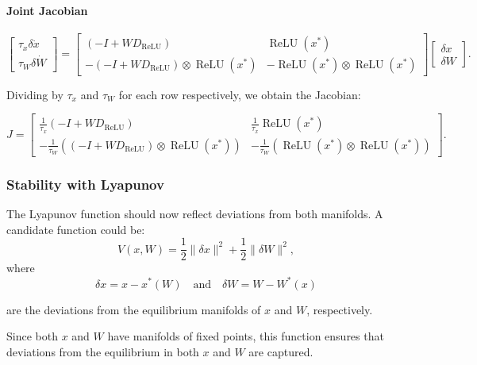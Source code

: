 \documentclass{article}
\theoremstyle{definition} \newtheorem{definition}{Definition}
\theoremstyle{remark} \newtheorem{remark}{Remark}
\newcounter{ct}
\begin{document}
\paragraph{Joint Jacobian}
\begin{equation}
\begin{bmatrix}
    \tau_x \delta \dot{x} \\
    \tau_W \delta \dot{W}
\end{bmatrix}
=
\begin{bmatrix}
    (-I + W D_{\operatorname{ReLU}}) & \operatorname{ReLU}(x^*) \\
    -(-I + W D_{\operatorname{ReLU}}) \otimes \operatorname{ReLU}(x^*) & -\operatorname{ReLU}(x^*) \otimes \operatorname{ReLU}(x^*)
\end{bmatrix}
\begin{bmatrix}
    \delta x \\
    \delta W
\end{bmatrix}.
\end{equation}

Dividing by \( \tau_x \) and \( \tau_W \) for each row respectively, we obtain the Jacobian:

\begin{equation}
J =
\begin{bmatrix}
    \frac{1}{\tau_x} (-I + W D_{\operatorname{ReLU}}) & \frac{1}{\tau_x} \operatorname{ReLU}(x^*) \\
    -\frac{1}{\tau_W} ((-I + W D_{\operatorname{ReLU}}) \otimes \operatorname{ReLU}(x^*)) & -\frac{1}{\tau_W} (\operatorname{ReLU}(x^*) \otimes \operatorname{ReLU}(x^*))
\end{bmatrix}.
\end{equation}

\subsubsection{Stability with Lyapunov}
The Lyapunov function should now reflect deviations from both manifolds. A candidate function could be:
\[
V(x, W) = \frac{1}{2} \| \delta x \|^2 + \frac{1}{2} \| \delta W \|^2,
\]
where 
\[
\delta x = x - x^*(W) \quad \text{and} \quad \delta W = W - W^*(x)
\]

are the deviations from the equilibrium manifolds of \(x\) and \(W\), respectively.

Since both \(x\) and \(W\) have manifolds of fixed points, this function ensures that deviations from the equilibrium in both \(x\) and \(W\) are captured.
\end{document}
